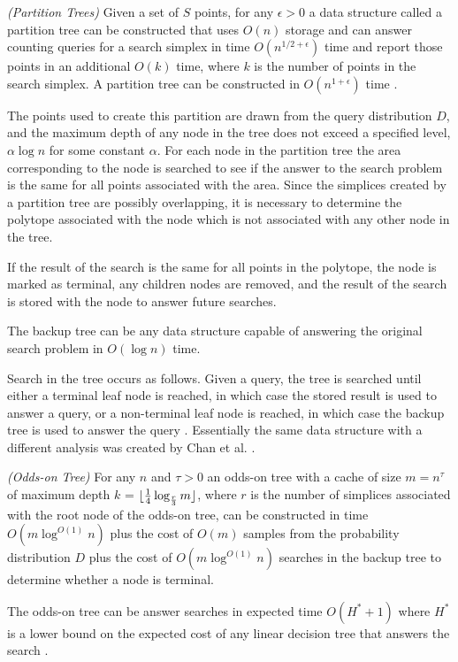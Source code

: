 \documentclass[mcs]{scsthesis}
\begin{document}
\begin{thm} \emph{(Partition Trees)} 
Given a set of \(S\) points, for any \(\epsilon > 0\) a data structure called
a partition tree can be constructed that uses \(O(n)\) storage and can answer
counting queries for a search simplex in time \(O(n^{1/2 + \epsilon})\) time and
report those points in an additional \(O(k)\) time, where \(k\) is the number
of points in the search simplex. A partition tree can be constructed in
\(O(n^{1 + \epsilon})\) time \cite{dutch}.
\end{thm}

The points used to create this partition are drawn from the query distribution
\(D\), and the maximum depth of any node in the tree does not exceed a specified
level, \(\alpha \log n\) for some constant \(\alpha\). For each node in the
partition tree the area corresponding to the node is searched to see if the
answer to the search problem is the same for all points associated with the
area. Since the simplices created by a partition tree are possibly overlapping,
it is necessary to determine the polytope associated with the node which is not
associated with any other node in the tree.

If the result of the search is the same for all points in the polytope, the node
is marked as terminal, any children nodes are removed, and the result of the
search is stored with the node to answer future searches.

The backup tree can be any data structure capable of answering the original
search problem in \(O(\log n)\) time.

Search in the tree occurs as follows. Given a query, the tree is searched until
either a terminal leaf node is reached, in which case the stored result is used
to answer a query, or a non-terminal leaf node is reached, in which case the
backup tree is used to answer the query \cite{oddson}. Essentially the same data
structure with a different analysis was created by Chan et al. \cite{chan}.

\begin{thm} \emph{(Odds-on Tree)}
For any \(n\) and \(\tau>0\) an odds-on tree with a cache of size \(m = n^\tau\)
of maximum depth \(k\) = \(\lfloor {1 \over 4} \log_{r \over 3} m \rfloor \),
where \(r\) is the number of simplices associated with the root node of the
odds-on tree, can be constructed in time \(O(m \log^{O(1)} n)\) plus the cost of
\(O(m)\) samples from the probability distribution \(D\) plus the cost of
\(O(m \log^{O(1)} n)\) searches in the backup tree to determine whether a node
is terminal.

The odds-on tree can be answer searches in expected time \(O(H^* + 1)\) where
\(H^*\) is a lower bound on the expected cost of any linear decision tree
that answers the search \cite{oddson}.  
\end{thm}
\end{document}
